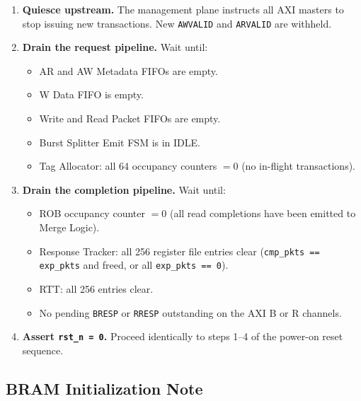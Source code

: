 \documentclass[11pt,a4paper]{article}
\begin{document}
\begin{enumerate}
  \item \textbf{Quiesce upstream.}
        The management plane instructs all AXI masters to stop issuing new
        transactions. New \texttt{AWVALID} and \texttt{ARVALID} are withheld.

  \item \textbf{Drain the request pipeline.}
        Wait until:
        \begin{itemize}
          \item AR and AW Metadata FIFOs are empty.
          \item W Data FIFO is empty.
          \item Write and Read Packet FIFOs are empty.
          \item Burst Splitter Emit FSM is in \textsc{IDLE}.
          \item Tag Allocator: all 64 occupancy counters $= 0$ (no in-flight transactions).
        \end{itemize}

  \item \textbf{Drain the completion pipeline.}
        Wait until:
        \begin{itemize}
          \item ROB occupancy counter $= 0$ (all read completions have been
                emitted to Merge Logic).
          \item Response Tracker: all 256 register file entries clear
                (\texttt{cmp\_pkts == exp\_pkts} and freed, or all
                \texttt{exp\_pkts == 0}).
          \item RTT: all 256 entries clear.
          \item No pending \texttt{BRESP} or \texttt{RRESP} outstanding on the
                AXI B or R channels.
        \end{itemize}

  \item \textbf{Assert \texttt{rst\_n = 0}.}
        Proceed identically to steps 1--4 of the power-on reset sequence.

\end{enumerate}

\subsection{BRAM Initialization Note}
\end{document}
